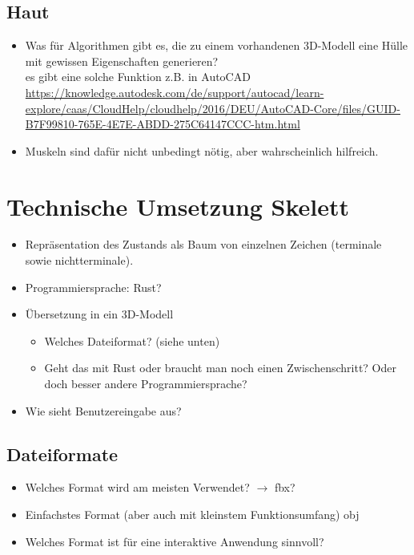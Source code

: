 \section{Haut}

\begin{itemize}
 \item Was für Algorithmen gibt es, die zu einem vorhandenen 3D-Modell eine Hülle mit gewissen Eigenschaften generieren? \\
 es gibt eine solche Funktion z.B. in AutoCAD \url{https://knowledge.autodesk.com/de/support/autocad/learn-explore/caas/CloudHelp/cloudhelp/2016/DEU/AutoCAD-Core/files/GUID-B7F99810-765E-4E7E-ABDD-275C64147CCC-htm.html}
 \item Muskeln sind dafür nicht unbedingt nötig, aber wahrscheinlich hilfreich.
\end{itemize}


\chapter{Technische Umsetzung Skelett}

\begin{itemize}
 \item Repräsentation des Zustands als Baum von einzelnen Zeichen (terminale sowie nichtterminale).
 \item Programmiersprache: Rust?
 \item Übersetzung in ein 3D-Modell
    \begin{itemize}
     \item Welches Dateiformat? (siehe unten)
     \item Geht das mit Rust oder braucht man noch einen Zwischenschritt? Oder doch besser andere Programmiersprache?
    \end{itemize}
 \item Wie sieht Benutzereingabe aus?
\end{itemize}




\section{Dateiformate}

\begin{itemize}
 \item Welches Format wird am meisten Verwendet? $\rightarrow$ fbx?
 \item Einfachstes Format (aber auch mit kleinstem Funktionsumfang) obj
 \item Welches Format ist für eine interaktive Anwendung sinnvoll?
\end{itemize}

